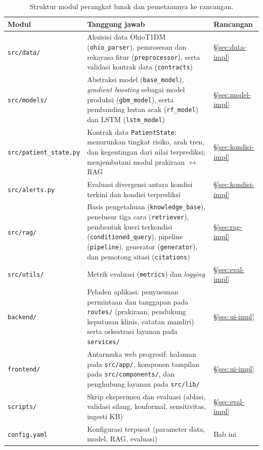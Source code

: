 \begin{table}[htbp]
\centering
\caption{Struktur modul perangkat lunak dan pemetaannya ke rancangan.}
\label{tab:struktur-modul}
\small
\begin{tabular}{@{}p{3.3cm}p{7cm}p{2.2cm}@{}}
\toprule
\textbf{Modul} & \textbf{Tanggung jawab} & \textbf{Rancangan} \\
\midrule
\texttt{src/data/} & Akuisisi data OhioT1DM (\texttt{ohio\_\allowbreak parser}), pemrosesan dan rekayasa fitur (\texttt{preprocessor}), serta validasi kontrak data (\texttt{contracts}) & \S\ref{sec:data-impl} \\[2pt]
\texttt{src/models/} & Abstraksi model (\texttt{base\_\allowbreak model}), \emph{gradient boosting} sebagai model produksi (\texttt{gbm\_\allowbreak model}), serta pembanding hutan acak (\texttt{rf\_\allowbreak model}) dan LSTM (\texttt{lstm\_\allowbreak model}) & \S\ref{sec:model-impl} \\[2pt]
\texttt{src/patient\_\allowbreak state.py} & Kontrak data \texttt{PatientState}: menurunkan tingkat risiko, arah tren, dan kegentingan dari nilai terprediksi; menjembatani modul prakiraan $\leftrightarrow$ RAG & \S\ref{sec:kondisi-impl} \\[2pt]
\texttt{src/alerts.py} & Evaluasi divergensi antara kondisi terkini dan kondisi terprediksi & \S\ref{sec:kondisi-impl} \\[2pt]
\texttt{src/rag/} & Basis pengetahuan (\texttt{knowledge\_\allowbreak base}), penelusur tiga cara (\texttt{retriever}), pembentuk kueri terkondisi (\texttt{conditioned\_\allowbreak query}), pipeline (\texttt{pipeline}), generator (\texttt{generator}), dan pemotong sitasi (\texttt{citations}) & \S\ref{sec:rag-impl} \\[2pt]
\texttt{src/utils/} & Metrik evaluasi (\texttt{metrics}) dan \emph{logging} & \S\ref{sec:eval-impl} \\[2pt]
\texttt{backend/} & Peladen aplikasi: penyusunan permintaan dan tanggapan pada \texttt{routes/} (prakiraan, pendukung keputusan klinis, catatan mandiri) serta orkestrasi layanan pada \texttt{services/} & \S\ref{sec:ui-impl} \\[2pt]
\texttt{frontend/} & Antarmuka web progresif: halaman pada \texttt{src/app/}, komponen tampilan pada \texttt{src/components/}, dan penghubung layanan pada \texttt{src/lib/} & \S\ref{sec:ui-impl} \\[2pt]
\texttt{scripts/} & Skrip eksperimen dan evaluasi (ablasi, validasi silang, konformal, sensitivitas, ingesti KB) & \S\ref{sec:eval-impl} \\[2pt]
\texttt{config.yaml} & Konfigurasi terpusat (parameter data, model, RAG, evaluasi) & Bab ini \\
\bottomrule
\end{tabular}
\end{table}
